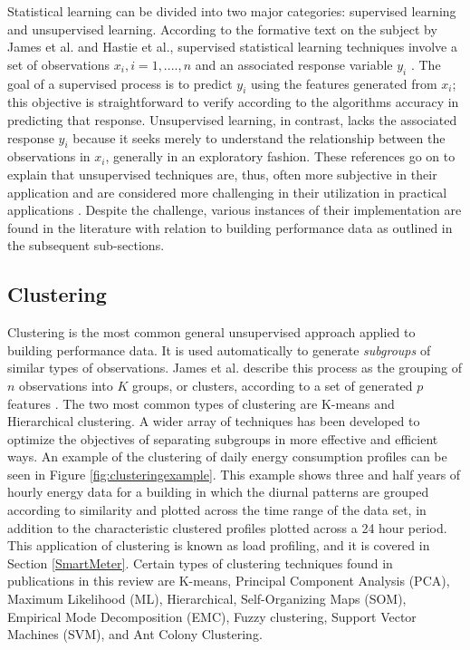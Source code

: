 \documentclass[preprint,12pt,3p]{elsarticle}
\begin{document}
Statistical learning can be divided into two major categories: supervised learning and unsupervised learning. According to the formative text on the subject by James et al. and Hastie et al., supervised statistical learning techniques involve a set of observations $x_i, i = 1,....,n$ and an associated response variable $y_i$ \cite{james_introduction_2013,hastie_elements_2009}. The goal of a supervised process is to predict $y_i$ using the features generated from $x_i$; this objective is straightforward to verify according to the algorithms accuracy in predicting that response. Unsupervised learning, in contrast, lacks the associated response $y_i$ because it seeks merely to understand the relationship between the observations in $x_i$, generally in an exploratory fashion. These references go on to explain that unsupervised techniques are, thus, often more subjective in their application and are considered more challenging in their utilization in practical applications \cite{mirkin_clustering:_2012,james_introduction_2013,hastie_elements_2009}. Despite the challenge, various instances of their implementation are found in the literature with relation to building performance data as outlined in the subsequent sub-sections.\\

\subsection{Clustering}
Clustering is the most common general unsupervised approach applied to building performance data. It is used automatically to generate \emph{subgroups} of similar types of observations. James et al. describe this process as the grouping of $n$ observations into $K$ groups, or clusters, according to a set of generated $p$ features \cite{james_introduction_2013}. The two most common types of clustering are K-means and Hierarchical clustering. A wider array of techniques has been developed to optimize the objectives of separating subgroups in more effective and efficient ways. An example of the clustering of daily energy consumption profiles can be seen in Figure \ref{fig:clusteringexample}. This example shows three and half years of hourly energy data for a building in which the diurnal patterns are grouped according to similarity and plotted across the time range of the data set, in addition to the characteristic clustered profiles plotted across a 24 hour period. This application of clustering is known as load profiling, and it is covered in Section \ref{SmartMeter}. Certain types of clustering techniques found in publications in this review are K-means, Principal Component Analysis (PCA), Maximum Likelihood (ML), Hierarchical, Self-Organizing Maps (SOM), Empirical Mode Decomposition (EMC), Fuzzy clustering, Support Vector Machines (SVM), and Ant Colony Clustering.
\end{document}
